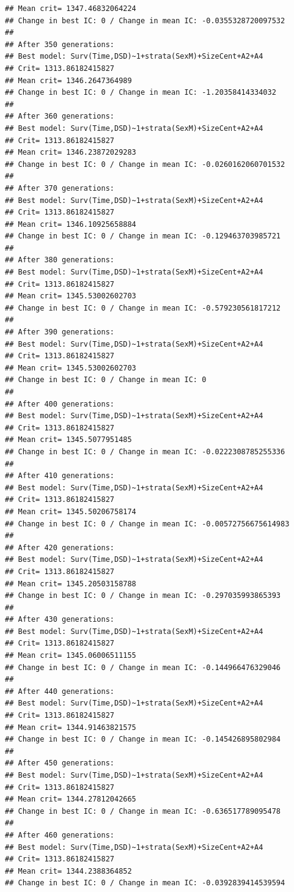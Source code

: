 \documentclass{article}\usepackage[]{graphicx}\usepackage[]{color}
\makeatletter
\newenvironment{kframe}{%
 \def\at@end@of@kframe{}%
 \ifinner\ifhmode%
  \def\at@end@of@kframe{\end{minipage}}%
  \begin{minipage}{\columnwidth}%
 \fi\fi%
 \def\FrameCommand##1{\hskip\@totalleftmargin \hskip-\fboxsep
 \colorbox{shadecolor}{##1}\hskip-\fboxsep
     \hskip-\linewidth \hskip-\@totalleftmargin \hskip\columnwidth}%
 \MakeFramed {\advance\hsize-\width
   \@totalleftmargin\z@ \linewidth\hsize
   \@setminipage}}%
 {\par\unskip\endMakeFramed%
 \at@end@of@kframe}
\newenvironment{knitrout}{}{} %
\makeatother
\begin{document}
\begin{knitrout}
\begin{kframe}
\begin{verbatim}
## Mean crit= 1347.46832064224
## Change in best IC: 0 / Change in mean IC: -0.0355328720097532
## 
## After 350 generations:
## Best model: Surv(Time,DSD)~1+strata(SexM)+SizeCent+A2+A4
## Crit= 1313.86182415827
## Mean crit= 1346.2647364989
## Change in best IC: 0 / Change in mean IC: -1.20358414334032
## 
## After 360 generations:
## Best model: Surv(Time,DSD)~1+strata(SexM)+SizeCent+A2+A4
## Crit= 1313.86182415827
## Mean crit= 1346.23872029283
## Change in best IC: 0 / Change in mean IC: -0.0260162060701532
## 
## After 370 generations:
## Best model: Surv(Time,DSD)~1+strata(SexM)+SizeCent+A2+A4
## Crit= 1313.86182415827
## Mean crit= 1346.10925658884
## Change in best IC: 0 / Change in mean IC: -0.129463703985721
## 
## After 380 generations:
## Best model: Surv(Time,DSD)~1+strata(SexM)+SizeCent+A2+A4
## Crit= 1313.86182415827
## Mean crit= 1345.53002602703
## Change in best IC: 0 / Change in mean IC: -0.579230561817212
## 
## After 390 generations:
## Best model: Surv(Time,DSD)~1+strata(SexM)+SizeCent+A2+A4
## Crit= 1313.86182415827
## Mean crit= 1345.53002602703
## Change in best IC: 0 / Change in mean IC: 0
## 
## After 400 generations:
## Best model: Surv(Time,DSD)~1+strata(SexM)+SizeCent+A2+A4
## Crit= 1313.86182415827
## Mean crit= 1345.5077951485
## Change in best IC: 0 / Change in mean IC: -0.0222308785255336
## 
## After 410 generations:
## Best model: Surv(Time,DSD)~1+strata(SexM)+SizeCent+A2+A4
## Crit= 1313.86182415827
## Mean crit= 1345.50206758174
## Change in best IC: 0 / Change in mean IC: -0.00572756675614983
## 
## After 420 generations:
## Best model: Surv(Time,DSD)~1+strata(SexM)+SizeCent+A2+A4
## Crit= 1313.86182415827
## Mean crit= 1345.20503158788
## Change in best IC: 0 / Change in mean IC: -0.297035993865393
## 
## After 430 generations:
## Best model: Surv(Time,DSD)~1+strata(SexM)+SizeCent+A2+A4
## Crit= 1313.86182415827
## Mean crit= 1345.06006511155
## Change in best IC: 0 / Change in mean IC: -0.144966476329046
## 
## After 440 generations:
## Best model: Surv(Time,DSD)~1+strata(SexM)+SizeCent+A2+A4
## Crit= 1313.86182415827
## Mean crit= 1344.91463821575
## Change in best IC: 0 / Change in mean IC: -0.145426895802984
## 
## After 450 generations:
## Best model: Surv(Time,DSD)~1+strata(SexM)+SizeCent+A2+A4
## Crit= 1313.86182415827
## Mean crit= 1344.27812042665
## Change in best IC: 0 / Change in mean IC: -0.636517789095478
## 
## After 460 generations:
## Best model: Surv(Time,DSD)~1+strata(SexM)+SizeCent+A2+A4
## Crit= 1313.86182415827
## Mean crit= 1344.2388364852
## Change in best IC: 0 / Change in mean IC: -0.0392839414539594

\end{verbatim}
\end{kframe}
\end{knitrout}
\end{document}
